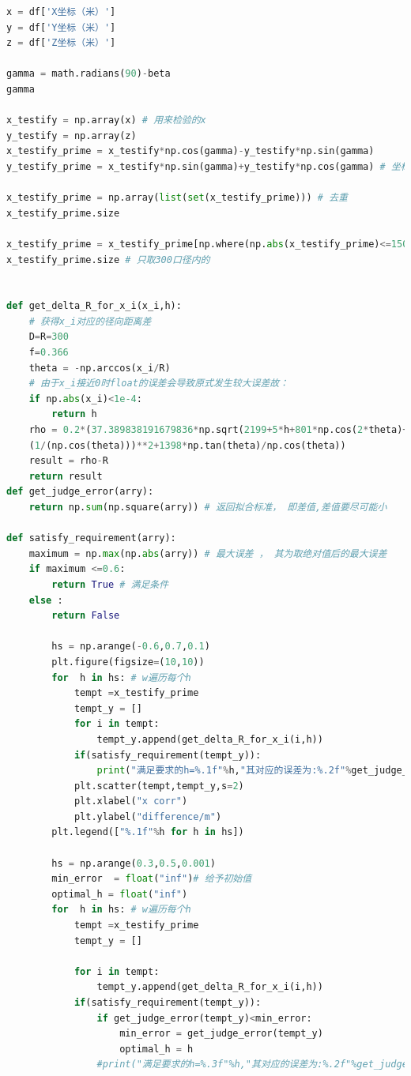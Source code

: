 \documentclass[withoutpreface,bwprint]{cumcmthesis} %
\begin{document}
\begin{appendices}
\begin{lstlisting}[language=python]
x = df['X坐标（米）']
y = df['Y坐标（米）']
z = df['Z坐标（米）']

gamma = math.radians(90)-beta
gamma

x_testify = np.array(x) # 用来检验的x
y_testify = np.array(z)
x_testify_prime = x_testify*np.cos(gamma)-y_testify*np.sin(gamma)
y_testify_prime = x_testify*np.sin(gamma)+y_testify*np.cos(gamma) # 坐标变换

x_testify_prime = np.array(list(set(x_testify_prime))) # 去重
x_testify_prime.size

x_testify_prime = x_testify_prime[np.where(np.abs(x_testify_prime)<=150)]
x_testify_prime.size # 只取300口径内的


def get_delta_R_for_x_i(x_i,h):
    # 获得x_i对应的径向距离差
    D=R=300
    f=0.366
    theta = -np.arccos(x_i/R)
    # 由于x_i接近0时float的误差会导致原式发生较大误差故：
    if np.abs(x_i)<1e-4:
        return h 
    rho = 0.2*(37.389838191679836*np.sqrt(2199+5*h+801*np.cos(2*theta)+5*h*np.cos(2*theta))*
    (1/(np.cos(theta)))**2+1398*np.tan(theta)/np.cos(theta))
    result = rho-R
    return result
def get_judge_error(arry):
    return np.sum(np.square(arry)) # 返回拟合标准， 即差值,差值要尽可能小

def satisfy_requirement(arry):
    maximum = np.max(np.abs(arry)) # 最大误差 ， 其为取绝对值后的最大误差
    if maximum <=0.6:
        return True # 满足条件
    else :
        return False 

        hs = np.arange(-0.6,0.7,0.1)
        plt.figure(figsize=(10,10))
        for  h in hs: # w遍历每个h 
            tempt =x_testify_prime
            tempt_y = []
            for i in tempt:
                tempt_y.append(get_delta_R_for_x_i(i,h))
            if(satisfy_requirement(tempt_y)):
                print("满足要求的h=%.1f"%h,"其对应的误差为:%.2f"%get_judge_error(tempt_y))
            plt.scatter(tempt,tempt_y,s=2)
            plt.xlabel("x corr")
            plt.ylabel("difference/m")
        plt.legend(["%.1f"%h for h in hs])

        hs = np.arange(0.3,0.5,0.001)
        min_error  = float("inf")# 给予初始值
        optimal_h = float("inf")
        for  h in hs: # w遍历每个h 
            tempt =x_testify_prime
            tempt_y = []
            
            for i in tempt:
                tempt_y.append(get_delta_R_for_x_i(i,h))
            if(satisfy_requirement(tempt_y)):
                if get_judge_error(tempt_y)<min_error:
                    min_error = get_judge_error(tempt_y)
                    optimal_h = h
                #print("满足要求的h=%.3f"%h,"其对应的误差为:%.2f"%get_judge_error(tempt_y))


\end{lstlisting}
\end{appendices}
\end{document}
